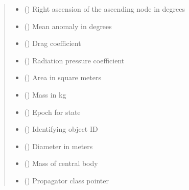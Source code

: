 \documentclass[letterpaper,10pt,english]{sphinxmanual}
\begin{document}
\begin{fulllineitems}
\begin{quote}
\begin{description}
\begin{itemize}
\item {} 
 () \textendash{} Right ascension of the ascending node in degrees

\item {} 
 () \textendash{} Mean anomaly in degrees

\item {} 
 () \textendash{} Drag coefficient

\item {} 
 () \textendash{} Radiation pressure coefficient

\item {} 
 () \textendash{} Area in square meters

\item {} 
 () \textendash{} Mass in kg

\item {} 
 () \textendash{} Epoch for state

\item {} 
 () \textendash{} Identifying object ID

\item {} 
 () \textendash{} Diameter in meters

\item {} 
 () \textendash{} Mass of central body

\item {} 
 ({\hyperref[\detokenize{modules/propagator_base:propagator_base.PropagatorBase}]{}}) \textendash{} Propagator class pointer


\end{itemize}
\end{description}
\end{quote}
\end{fulllineitems}
\end{document}
